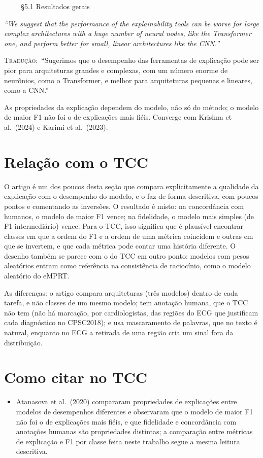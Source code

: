\documentclass[11pt,a4paper]{article}
\newcommand{\pagechip}[1]{{\setlength{\fboxsep}{1.5pt}\colorbox{cAcc}{\textcolor{white}{\scriptsize\texttt{#1}}}}}
\newenvironment{origquote}{\par\itshape\small}{\par}
\newenvironment{tradquote}{\par\small\textsc{Tradução:}\ }{\par}
\newcommand{\explab}[1]{\par\smallskip{\small\color{cAcc}\textbf{\MakeUppercase{#1}}}\par}
\begin{document}
\begin{citacard}{\pagechip{p. 7} §5.1 Resultados gerais}
\begin{origquote}“We suggest that the performance of the explainability tools can be worse for large complex architectures with a huge number of neural nodes, like the Transformer one, and perform better for small, linear architectures like the CNN.”\end{origquote}
\begin{tradquote}“Sugerimos que o desempenho das ferramentas de explicação pode ser pior para arquiteturas grandes e complexas, com um número enorme de neurônios, como o Transformer, e melhor para arquiteturas pequenas e lineares, como a CNN.”\end{tradquote}
\explab{Explicação}
As propriedades da explicação dependem do modelo, não só do método; o modelo de maior F1 não foi o de explicações mais fiéis. Converge com Krishna et al.\ (2024) e Karimi et al.\ (2023).
\end{citacard}

\section{Relação com o TCC}
O artigo é um dos poucos desta seção que compara explicitamente a qualidade da explicação com o desempenho do modelo, e o faz de forma descritiva, com poucos pontos e comentando as inversões. O resultado é misto: na concordância com humanos, o modelo de maior F1 vence; na fidelidade, o modelo mais simples (de F1 intermediário) vence. Para o TCC, isso significa que é plausível encontrar classes em que a ordem do F1 e a ordem de uma métrica coincidem e outras em que se invertem, e que cada métrica pode contar uma história diferente. O desenho também se parece com o do TCC em outro ponto: modelos com pesos aleatórios entram como referência na consistência de raciocínio, como o modelo aleatório do eMPRT.

As diferenças: o artigo compara arquiteturas (três modelos) dentro de cada tarefa, e não classes de um mesmo modelo; tem anotação humana, que o TCC não tem (não há marcação, por cardiologistas, das regiões do ECG que justificam cada diagnóstico no CPSC2018); e usa mascaramento de palavras, que no texto é natural, enquanto no ECG a retirada de uma região cria um sinal fora da distribuição.

\section{Como citar no TCC}
\begin{itemize}
  \item Atanasova et al.\ (2020) compararam propriedades de explicações entre modelos de desempenhos diferentes e observaram que o modelo de maior F1 não foi o de explicações mais fiéis, e que fidelidade e concordância com anotações humanas são propriedades distintas; a comparação entre métricas de explicação e F1 por classe feita neste trabalho segue a mesma leitura descritiva.
\end{itemize}
\end{document}
